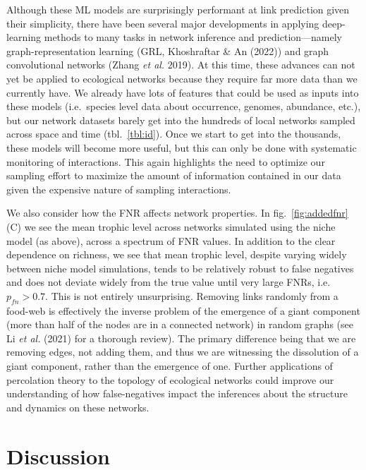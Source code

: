 \documentclass[11pt]{article}
\begin{document}
Although these ML models are surprisingly performant at link prediction
given their simplicity, there have been several major developments in
applying deep-learning methods to many tasks in network inference and
prediction---namely graph-representation learning (GRL, Khoshraftar \&
An (2022)) and graph convolutional networks (Zhang \emph{et al.} 2019).
At this time, these advances can not yet be applied to ecological
networks because they require far more data than we currently have. We
already have lots of features that could be used as inputs into these
models (i.e.~species level data about occurrence, genomes, abundance,
etc.), but our network datasets barely get into the hundreds of local
networks sampled across space and time (tbl.~\ref{tbl:id}). Once we
start to get into the thousands, these models will become more useful,
but this can only be done with systematic monitoring of interactions.
This again highlights the need to optimize our sampling effort to
maximize the amount of information contained in our data given the
expensive nature of sampling interactions.

We also consider how the FNR affects network properties. In
fig.~\ref{fig:addedfnr}(C) we see the mean trophic level across networks
simulated using the niche model (as above), across a spectrum of FNR
values. In addition to the clear dependence on richness, we see that
mean trophic level, despite varying widely between niche model
simulations, tends to be relatively robust to false negatives and does
not deviate widely from the true value until very large FNRs,
i.e.~\(p_{fn} > 0.7\). This is not entirely unsurprising. Removing links
randomly from a food-web is effectively the inverse problem of the
emergence of a giant component (more than half of the nodes are in a
connected network) in random graphs (see Li \emph{et al.} (2021) for a
thorough review). The primary difference being that we are removing
edges, not adding them, and thus we are witnessing the dissolution of a
giant component, rather than the emergence of one. Further applications
of percolation theory to the topology of ecological networks could
improve our understanding of how false-negatives impact the inferences
about the structure and dynamics on these networks.

\hypertarget{discussion}{%
\section{Discussion}\label{discussion}}
\end{document}
